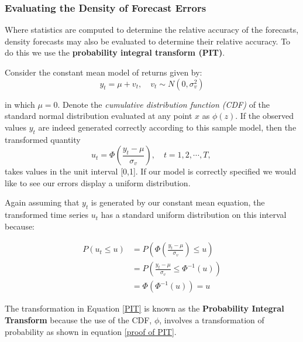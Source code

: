 \documentclass[11pt]{article}
\begin{document}
\subsubsection{Evaluating the Density of Forecast Errors}

Where statistics are computed to determine the relative accuracy of the forecasts, density forecasts may also be evaluated to determine their relative accuracy. To do this we use the \textbf{probability integral transform (PIT)}.

Consider the constant mean model of returns given by:
\begin{equation}
y_t=\mu+v_t, \quad v_t \sim N\left(0, \sigma_v^2\right)
\end{equation}

in which $\mu=0$. Denote the \textit{cumulative distribution function (CDF)} of the standard normal distribution evaluated at any point $x$ as $\phi(z)$. If the observed values $y_t$ are indeed generated correctly according to this sample model, then the transformed quantity
\begin{equation}
\label{PIT}
u_t=\Phi\left(\frac{y_t-\mu}{\sigma_v}\right), \quad t=1,2, \cdots, T \text {, }
\end{equation}
takes values in the unit interval [0,1]. If our model is correctly specified we would like to see our errors display a uniform distribution.

Again assuming that $y_t$ is generated by our constant mean equation, the transformed time series $u_t$ has a standard uniform distribution on this interval because:

\begin{equation}
\label{proof of PIT}
\begin{aligned}
P\left(u_t \leq u\right) & =P\left(\Phi\left(\frac{y_t-\mu}{\sigma_v}\right) \leqslant u\right) \\
& =P\left(\frac{y_t-\mu}{\sigma_v} \leqslant \Phi^{-1}(u)\right) \\
& =\Phi\left(\Phi^{-1}(u)\right)=u
\end{aligned}
\end{equation}

The transformation in Equation \eqref{PIT} is known as the \textbf{Probability Integral Transform} because the use of the CDF, $\phi$, involves a transformation of probability as shown in equation \eqref{proof of PIT}.
\end{document}
